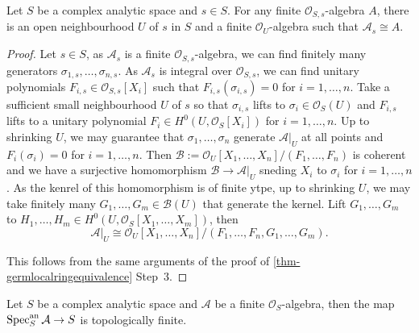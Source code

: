 \begin{lemma}\label{lma-spreadfinitelag}
    Let $S$ be a complex analytic space and $s\in S$. For any finite $\mathcal{O}_{S,s}$-algebra $A$, there is an open neighbourhood $U$ of $s$ in $S$ and a finite $\mathcal{O}_U$-algebra such that $\mathcal{A}_s\cong A$.
\end{lemma}
\begin{proof}
    Let $s\in S$, as $\mathcal{A}_s$ is a finite $\mathcal{O}_{S,s}$-algebra, we can find finitely many generators $\sigma_{1,s},\ldots,\sigma_{n,s}$. As $\mathcal{A}_s$ is integral over $\mathcal{O}_{S,s}$, we can find unitary polynomials $F_{i,s}\in \mathcal{O}_{S,s}[X_i]$ such that $F_{i,s}(\sigma_{i,s})=0$ for $i=1,\ldots,n$. Take a sufficient small neighbourhood $U$ of $s$ so that $\sigma_{i,s}$ lifts to $\sigma_i\in \mathcal{O}_S(U)$ and $F_{i,s}$ lifts to a unitary polynomial $F_i\in H^0(U,\mathcal{O}_S[X_i])$ for $i=1,\ldots,n$. Up to shrinking $U$, we may guarantee that $\sigma_1,\ldots,\sigma_n$ generate $\mathcal{A}|_U$ at all points and $F_i(\sigma_i)=0$ for $i=1,\ldots,n$. Then $\mathcal{B}:=\mathcal{O}_U[X_1,\ldots,X_n]/(F_1,\ldots,F_n)$ is coherent and we have a surjective homomorphism $\mathcal{B}\rightarrow \mathcal{A}|_U$ sneding $X_i$ to $\sigma_i$ for $i=1,\ldots,n$. As the kenrel of this homomorphism is of finite ytpe, up to shrinking $U$, we may take finitely many $G_1,\ldots,G_m\in \mathcal{B}(U)$ that generate the kernel. Lift $G_1,\ldots,G_m$ to $H_1,\ldots,H_m\in H^0(U,\mathcal{O}_S[X_1,\ldots,X_m])$, then
    \[
        \mathcal{A}|_U\cong \mathcal{O}_U[X_1,\ldots,X_n]/(F_1,\ldots,F_n,G_1,\ldots,G_m).  
    \]


   This follows from the same arguments of the proof of \cref{thm-germlocalringequivalence} Step~3.
\end{proof}
\begin{corollary}\label{cor-specanfinitetopfinite}
    Let $S$ be a complex analytic space and $\mathcal{A}$ be a finite $\mathcal{O}_S$-algebra, then the map $\operatorname{Spec}^{\mathrm{an}}_S \mathcal{A}\rightarrow S$ is topologically finite.
\end{corollary}
